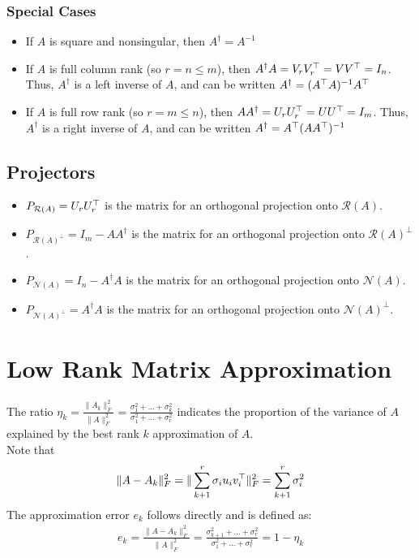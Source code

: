 \documentclass[12pt]{article}
\begin{document}
\subsubsection*{Special Cases}
\begin{itemize}
    \item If $A$ is square and nonsingular, then $A^\dagger = A^{-1}$
    \item If $A$ is full column rank (so $r = n \leq m$), then $A^\dagger A = V_r V_r^\top = VV^\top = I_n$. Thus, $A^\dagger$ is a left inverse of $A$, and can be written $A^\dagger = (A^\top A)^{-1}A^\top$
    \item  If $A$ is full row rank (so $r = m \leq n$), then $AA^\dagger = U_r U_r^\top = UU^\top = I_m$. Thus, $A^\dagger$ is a right inverse of $A$, and can be written $A^\dagger = A^\top (AA^\top)^{-1}$
\end{itemize}
\subsection*{Projectors}
\begin{itemize}
    \item $P_{\mathcal{R}(A)}= U_rU_r^\top$ is the matrix for an orthogonal projection onto $\mathcal{R}(A)$.
    \item $P_{\mathcal{R}(A)^\perp}= I_m -AA^\dagger$ is the matrix for an orthogonal projection onto $\mathcal{R}(A)^\perp$.
     \item $P_{\mathcal{N}(A)}= I_n -A^\dagger A$ is the matrix for an orthogonal projection onto $\mathcal{N}(A)$.
    \item $P_{\mathcal{N}(A)^\perp}= A^\dagger A$ is the matrix for an orthogonal projection onto $\mathcal{N}(A)^\perp$.
\end{itemize}


\section{Low Rank Matrix Approximation}
The ratio $\eta_k = \frac{\|A_k\|_F^2}{\|A\|_F^2} = \frac{\sigma_1^2+...+ \sigma_k^2}{\sigma_1^2+...+ \sigma_r^2}$ indicates the proportion of the variance of $A$ explained by the best rank $k$ approximation of $A$.\\
Note that
\begin{gather*}
    \|A - A_k\|_F^2 = \|\sum_{k+1}^r \sigma_i u_i v_i^\top\|_F^2 = \sum_{k+1}^r \sigma_i^2
\end{gather*}
The approximation error $e_k$ follows directly and is defined as:
\begin{gather*}
  e_k =  \frac{\|A - A_k\|_F^2}{\|A\|_F^2} = \frac{\sigma_{k+1}^2+...+ \sigma_r^2}{\sigma_1^2+...+ \sigma_r^2} = 1 - \eta_k
\end{gather*}
\end{document}
